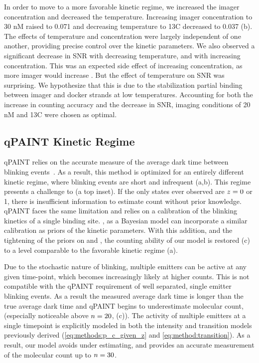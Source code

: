 In order to move to a more favorable kinetic regime, 
we increased the imager concentration and decreased the temperature.
	Increasing imager concentration to 30 nM raised \pon to 0.071 and 
	decreasing temperature to 13\textdegree C decreased \poff to 0.037 
	(b).
	The effects of temperature and concentration were largely independent 
	of one another, providing precise control over the kinetic parameters. %
	We also observed a significant decrease in SNR with decreasing temperature, 
	and with increasing concentration. 
	This was an expected side effect of increasing concentration, as more imager would increase \rb.
	But the effect of temperature on SNR was surprising. 
	We hypothesize that this is due to the stabilization partial 
	binding between imager and docker strands at low temperatures.
	Accounting for both the increase in counting accuracy and the decrease 
	in SNR, imaging conditions of 20 nM and 13\textdegree C were chosen as optimal.

\subsection{qPAINT Kinetic Regime}
qPAINT relies on the accurate measure of the average dark time between blinking events~\citep{jungmann_2016}. 
	As a result, this method is optimized for an entirely different kinetic regime, where blinking 
	events are short and infrequent (a,b).
	This regime presents a challenge to \ours (a top inset). 
	If the only states ever observed are $z_{}=0$ or 1, there is insufficient 
	information to estimate count without prior knowledge.
	qPAINT faces the same limitation and relies on a calibration 
	of the blinking kinetics of a single binding site.
	\ours, as a Bayesian model can incorporate a similar calibration 
	as priors of the kinetic parameters.
	With this addition, and the tightening of the priors on \re and \rb, the counting 
	ability of our model is restored (c) to 
	a level comparable to the favorable kinetic regime (a).

Due to the stochastic nature of blinking, multiple emitters can 
be active at any given time-point, which becomes increasingly likely at higher counts.
	This is not compatible with the qPAINT requirement of well separated, 
	single emitter blinking events.
	As a result the measured average dark time is longer than the true average dark time
	and  qPAINT begins to underestimate molecular count, 
	(especially noticeable above $n=20$, (c)). 
	The activity of multiple emitters at a single timepoint is explicitly modeled in both the 
	intensity and transition models previously derived (\eqref{eq:methods:p_c_given_z} and \eqref{eq:method:transition}). 
	As a result, our model avoids under estimating, and provides an accurate measurement 
	of the molecular count up to $n=30$.
	
